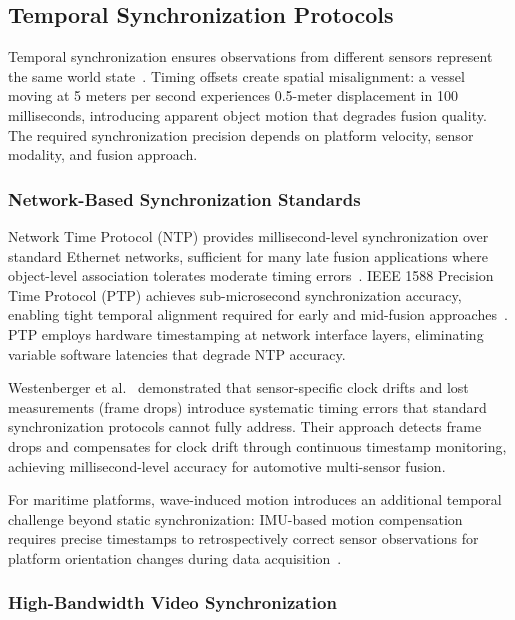 \documentclass[../main.tex]{subfiles}
\begin{document}
\subsection{Temporal Synchronization Protocols}

Temporal synchronization ensures observations from different sensors represent the same world state~\cite{westenberger2011}.
Timing offsets create spatial misalignment: a vessel moving at 5 meters per second experiences 0.5-meter displacement in 100 milliseconds, introducing apparent object motion that degrades fusion quality.
The required synchronization precision depends on platform velocity, sensor modality, and fusion approach.

\subsubsection{Network-Based Synchronization Standards}

Network Time Protocol (NTP) provides millisecond-level synchronization over standard Ethernet networks, sufficient for many late fusion applications where object-level association tolerates moderate timing errors~\cite{furgale2013}.
IEEE 1588 Precision Time Protocol (PTP) achieves sub-microsecond synchronization accuracy, enabling tight temporal alignment required for early and mid-fusion approaches~\cite{ptp2008}.
PTP employs hardware timestamping at network interface layers, eliminating variable software latencies that degrade NTP accuracy.

Westenberger et al.~\cite{westenberger2011} demonstrated that sensor-specific clock drifts and lost measurements (frame drops) introduce systematic timing errors that standard synchronization protocols cannot fully address.
Their approach detects frame drops and compensates for clock drift through continuous timestamp monitoring, achieving millisecond-level accuracy for automotive multi-sensor fusion.

For maritime platforms, wave-induced motion introduces an additional temporal challenge beyond static synchronization: IMU-based motion compensation requires precise timestamps to retrospectively correct sensor observations for platform orientation changes during data acquisition~\cite{liu2021}.

\subsubsection{High-Bandwidth Video Synchronization}
\end{document}
